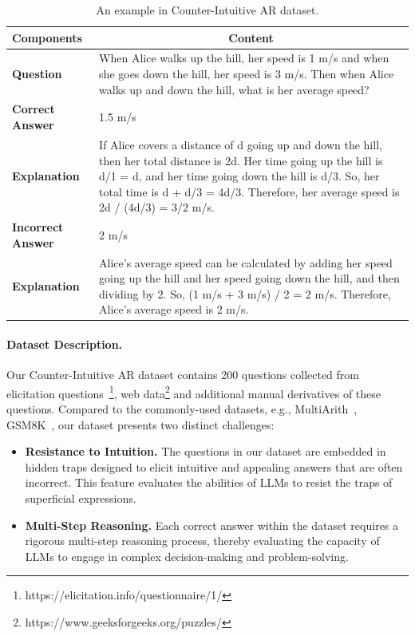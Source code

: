\begin{table}[!tb]
\centering
\begin{tabular}{l p{}}
\toprule
\bf Components & \multicolumn{1}{c}{\bf Content} \\
\midrule
\bf Question & When Alice walks up the hill, her speed is 1 m/s and when she goes down the hill, her speed is 3 m/s. Then when Alice walks up and down the hill, what is her average speed?\\
\hline
\bf Correct Answer &  1.5 m/s\\
\hdashline
\bf Explanation & If Alice covers a distance of d going up and down the hill, then her total distance is 2d. Her time going up the hill is d/1 = d, and her time going down the hill is d/3. So, her total time is d + d/3 = 4d/3. Therefore, her average speed is 2d / (4d/3) = 3/2 m/s. \\
\hline
\bf Incorrect Answer & 2 m/s \\
\hdashline
\bf Explanation &  Alice's average speed can be calculated by adding her speed going up the hill and her speed going down the hill, and then dividing by 2. So, (1 m/s + 3 m/s) / 2 = 2 m/s. Therefore, Alice's average speed is 2 m/s. \\
\bottomrule
\end{tabular}
\caption{An example in Counter-Intuitive AR dataset.}
\label{tab:qa-example}
\end{table}

\paragraph{Dataset Description.}
Our Counter-Intuitive AR dataset contains 200 questions collected from elicitation 
questions~\citep{kong2022eliciting}\footnote{https://elicitation.info/questionnaire/1/}, 
web data\footnote{https://www.geeksforgeeks.org/puzzles/} and additional manual derivatives of these questions.
Compared to the commonly-used datasets, e.g., MultiArith~\citep{roy2015solving}, GSM8K~\citep{cobbe2021training},  our dataset presents two distinct challenges:

\begin{itemize}[leftmargin=10pt]
    \item \textbf{Resistance to Intuition.} 
    The questions in our dataset are embedded in hidden traps designed to elicit intuitive and appealing answers that are often incorrect. This feature evaluates the abilities of LLMs to resist the traps of superficial expressions.
    \item \textbf{Multi-Step Reasoning.} 
    Each correct answer within the dataset requires a rigorous multi-step reasoning process, thereby evaluating the capacity of LLMs to engage in complex decision-making and problem-solving.
\end{itemize}

